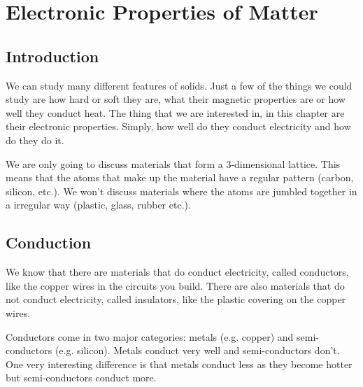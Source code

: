 \chapter{Electronic Properties of Matter}
\label{p:mm:ep11}

\section{Introduction}

We can study many different features of solids. Just a few of the things we could study are how hard or soft they are, what their magnetic properties are or how well they conduct heat. The thing that we are interested in, in this chapter are their electronic properties. Simply, how well do they conduct electricity and how do they do it.

We are only going to discuss materials that form a 3-dimensional lattice. This means that the atoms that make up the material have a regular pattern (carbon, silicon, etc.). We won't discuss materials where the atoms are jumbled together in a irregular way (plastic, glass, rubber etc.).

\section{Conduction}

We know that there are materials that do conduct electricity, called conductors, like the copper wires in the circuits you build. There are also materials that do not conduct electricity, called insulators, like the plastic covering on the copper wires.

Conductors come in two major categories: metals (e.g. copper) and semi-conductors (e.g. silicon). Metals conduct very well and semi-conductors don't. One very interesting difference is that metals conduct less as they become hotter but semi-conductors conduct more.


